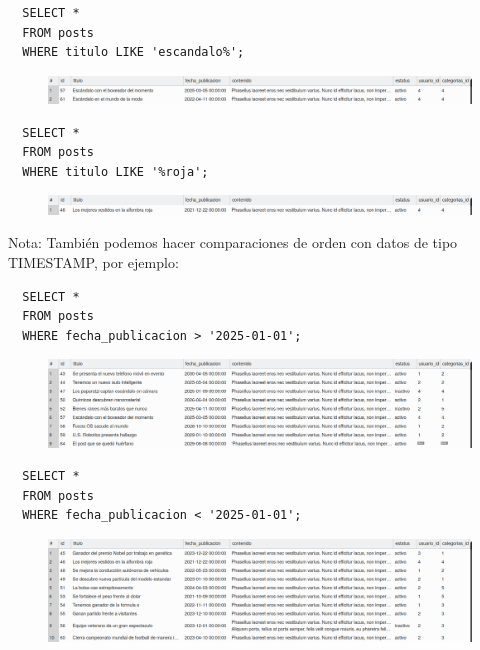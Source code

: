 \documentclass{article}
\begin{document}
\begin{verbatim}
  SELECT *
  FROM posts
  WHERE titulo LIKE 'escandalo%';
\end{verbatim}

\begin{figure}[h!]
  \centering
  \includegraphics[scale=0.5]{./Pictures/109_where_like.png}
\end{figure}

\begin{verbatim}
  SELECT *
  FROM posts
  WHERE titulo LIKE '%roja';
\end{verbatim}

\begin{figure}[h!]
  \centering
  \includegraphics[scale=0.5]{./Pictures/110_where_like.png}
\end{figure}

Nota: También podemos hacer comparaciones de orden con datos de tipo TIMESTAMP, por ejemplo:

\begin{verbatim}
  SELECT *
  FROM posts
  WHERE fecha_publicacion > '2025-01-01';
\end{verbatim}

\begin{figure}[h!]
  \centering
  \includegraphics[scale=0.5]{./Pictures/111_where_fecha.png}
\end{figure}

\begin{verbatim}
  SELECT *
  FROM posts
  WHERE fecha_publicacion < '2025-01-01';
\end{verbatim}

\begin{figure}[h!]
  \centering
  \includegraphics[scale=0.5]{./Pictures/112_where_fecha.png}
\end{figure}
\end{document}
